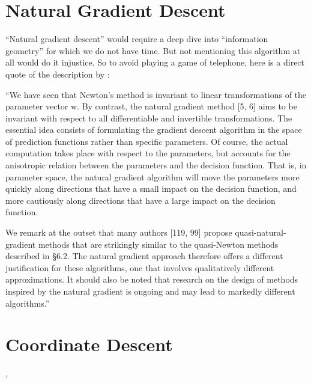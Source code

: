 \section{Natural Gradient Descent}

``Natural gradient descent'' would require a deep dive into ``information geometry''
for which we do not have time. But not mentioning this algorithm at all would do it
injustice. So to avoid playing a game of telephone, here is a direct quote of
the description by \textcite{bottouOptimizationMethodsLargeScale2018}:

``We have seen that Newton's method is invariant to linear transformations of
the parameter vector w. By contrast, the natural gradient method [5, 6] aims to
be invariant with respect to all differentiable and invertible transformations.
The essential idea consists of formulating the gradient descent algorithm in the
space of prediction functions rather than specific parameters. Of course, the
actual computation takes place with respect to the parameters, but accounts for
the anisotropic relation between the parameters and the decision function. That
is, in parameter space, the natural gradient algorithm will move the parameters
more quickly along directions that have a small impact on the decision function,
and more cautiously along directions that have a large impact on the decision
function.

We remark at the outset that many authors [119, 99] propose
quasi-natural-gradient methods that are strikingly similar to the quasi-Newton
methods described in §6.2. The natural gradient approach therefore offers a
different justification for these algorithms, one that involves qualitatively
different approximations. It should also be noted that research on the design of
methods inspired by the natural gradient is ongoing and may lead to markedly
different algorithms.''

\section{Coordinate Descent}

\textcite[7.3]{bottouOptimizationMethodsLargeScale2018}, \textcite[6.4]{bubeckConvexOptimizationAlgorithms2015}



\endinput
